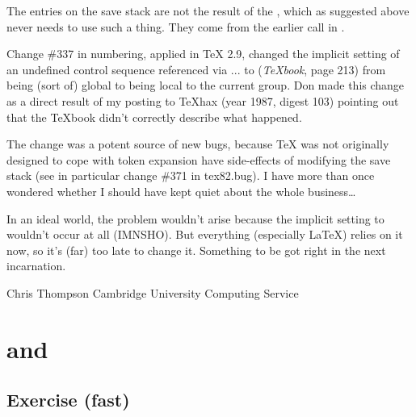 The entries on the save stack are not the result of the 
\cmd{\global}\cmd{\@namedef},
which as suggested above never needs to use such a thing. They come from
the earlier \cmd{\@ifundefined} call in \cmd{\newlabel}.

Change \#337 in  numbering, applied in TeX 2.9, changed the implicit
setting of an undefined control sequence referenced via \cmd{\csname}...\cmd{\endcsname}
to \cmd{\relax} (\emph{TeXbook}, page 213) from being (sort of) global to being local to
the current group. Don made this change as a direct result of my posting to
TeXhax (year 1987, digest 103) pointing out that the TeXbook didn't correctly
describe what happened.

The change was a potent source of new bugs, because TeX was not originally
designed to cope with token expansion have side-effects of modifying the
save stack (see in particular change \#371 in tex82.bug). I have more than
once wondered whether I should have kept quiet about the whole business\ldots

In an ideal world, the problem wouldn't arise because the implicit setting
to \cmd{\relax} wouldn't occur at all (IMNSHO). But everything (especially LaTeX)
relies on it now, so it's (far) too late to change it. Something to be got
right in the next incarnation.

\begin{lcode}
Chris Thompson
Cambridge University Computing Service
\end{lcode}



\chapter{ and }

\section{Exercise (fast)}

\begin{comment}
Date: 13 Oct 1993 12:31:56 -0400 (EDT)
From: Michael Downes <MJD@MATH.AMS.ORG>
Subject: Around the Bend #13
To: info-tex@shsu.edu
X-ListName: TeX-Related Network Discussion List <INFO-TeX@SHSU.edu>
\end{comment}


\begin{lcode}
\let\+\let\+\a\advance\+\c\catcode\+\d\def\+\f\fam\+\m\mag\f"20\d~{\c\f9
\a\f1 \ifnum\f>125\f002\d~{\a\f-1 \ifnum\f<1\egroup\fi}\fi~}\c`\^^M="9{~
\end{lcode}

